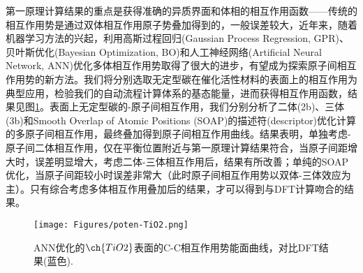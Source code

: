第一原理计算结果的重点是获得准确的异质界面和体相的相互作用函数——传统的相互作用势是通过双体相互作用原子势叠加得到的，一般误差较大，近年来，随着机器学习方法的兴起，利用高斯过程回归\textrm{(Gaussian Process Regression, GPR)}、贝叶斯优化\textrm{(Bayesian Optimization, BO)}和人工神经网络\textrm{(Artificial Neural Network, ANN)}优化多体相互作用势取得了很大的进步，有望成为探索原子间相互作用势的新方法。我们将分别选取无定型碳在催化活性材料的表面上的相互作用为典型应用，检验我们的自动流程计算体系的基态能量，进而获得相互作用函数，结果见图\ref{ANN-poten-TiO2}。表面上无定型碳的-原子间相互作用，我们分别分析了二体\textrm{(2b)}、三体\textrm{(3b)}和\textrm{Smooth Overlap of Atomic Positions (SOAP)}的描述符\textrm{(descriptor)}优化计算的多原子间相互作用，最终叠加得到原子间相互作用曲线。结果表明，单独考虑-原子间二体相互作用，仅在平衡位置附近与第一原理计算结果符合，当原子间距增大时，误差明显增大，考虑二体-三体相互作用后，结果有所改善；单纯的\textrm{SOAP}优化，当原子间距较小时误差非常大（此时原子间相互作用势以双体-三体效应为主）。只有综合考虑多体相互作用叠加后的结果，才可以得到与\textrm{DFT}计算吻合的结果。
\begin{figure}[h!]
\centering
\vskip -5pt
\texttt{[image: Figures/poten-TiO2.png]}%
\caption{\textrm{ANN}优化的$\ch{TiO2}$表面的\textrm{C-C}相互作用势能面曲线，对比\textrm{DFT}结果(蓝色).}%
\label{ANN-poten-TiO2}
\end{figure}


